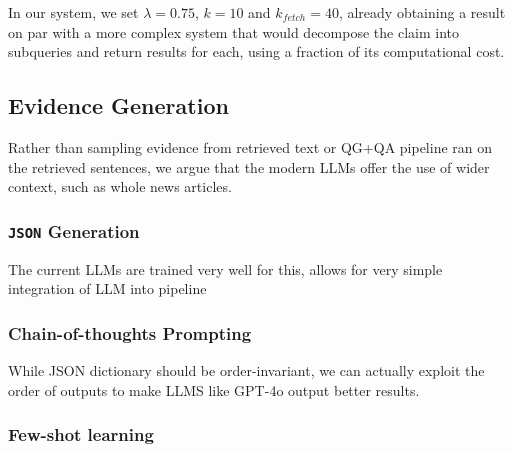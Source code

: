 In our system, we set $\lambda=0.75$, $k=10$ and $k_{fetch} = 40$, already obtaining a result on par with a more complex system that would decompose the claim into subqueries and return results for each, using a fraction of its computational cost.

\subsection{Evidence Generation}
Rather than sampling evidence from retrieved text or QG+QA pipeline ran on the retrieved sentences, we argue that the modern LLMs offer the use of wider context, such as whole news articles.

\subsubsection{\texttt{JSON} Generation}
The current LLMs are trained very well for this, allows for very simple integration of LLM into pipeline

\subsubsection{Chain-of-thoughts Prompting}
While JSON dictionary should be order-invariant, we can actually exploit the order of outputs to make LLMS like GPT-4o output better results.

\subsubsection{Few-shot learning}



